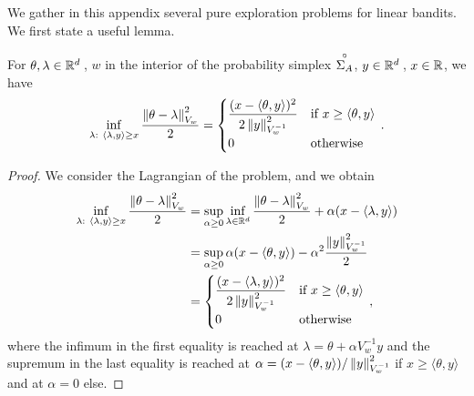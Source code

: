 We gather in this appendix several pure exploration problems for linear bandits. We first state a useful lemma.

\begin{lemma}\label{lem:lagrange_alternative}
For $\theta, \lambda \in \mathbb{R}^d\,$, $w$ in the interior of the probability simplex $\overset{\circ}{\Sigma_A}$, $y\in\mathbb{R}^d\,$, $x\in\mathbb{R}$, we have
\begin{align*}
\inf_{\lambda:\ \langle \lambda,y\rangle \geq x} \frac{\left\lVert\theta-\lambda\right\rVert^2_{V_w}}{2} = \begin{cases}
\dfrac{(x - \langle\theta,y\rangle)^2}{2 \left\lVert y\right\rVert_{V_w^{-1}}^2} &\text{if } x \geq \langle\theta,y\rangle \\
0 &\text{otherwise}
\end{cases}\,.
\end{align*}
\end{lemma}

\begin{proof}
We consider the Lagrangian of the problem, and we obtain
\begin{align*}
  \inf_{\lambda:\ \langle \lambda,y \rangle \geq x} \frac{\left\lVert\theta-\lambda\right\rVert^2_{V_w}}{2}
  &= \sup_{\alpha \geq 0}\inf_{\lambda \in \mathbb{R}^d} \frac{\left\lVert\theta-\lambda\right\rVert^2_{V_w}}{2}+ \alpha (x-\langle\lambda,y\rangle)\\
  &=  \sup_{\alpha \geq 0} \alpha (x-\langle\theta,y\rangle) - \alpha^2 \frac{\left\lVert y\right\rVert^2_{V_w^{-1}}}{2}\\
  &= \begin{cases}
  \dfrac{(x - \langle\lambda,y\rangle)^2}{2 \left\lVert y\right\rVert_{V_w^{-1}}^2} &\text{if } x \geq \langle\theta,y\rangle \\
  0 & \text{otherwise}
  \end{cases}\,,
\end{align*}
where the infimum in the first equality is reached at $\lambda = \theta + \alpha V_w^{-1} y$ and the supremum in the last equality is reached at $\alpha = (x- \langle\theta,y\rangle)/\left\lVert y\right\rVert_{V_w^{-1}}^2$ if $x \geq \langle\theta,y\rangle$ and at $\alpha = 0$ else.
\end{proof}

